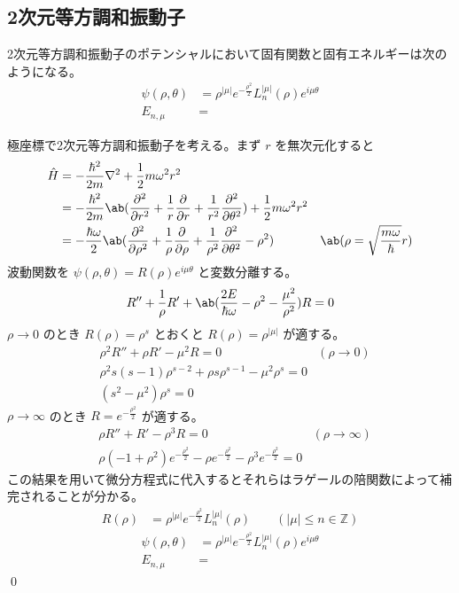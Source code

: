 \documentclass[uplatex,dvipdfmx,a4paper,11pt]{jlreq}
\makeatletter
\newcommand{\ZZ}{\mathbb{Z}}
\numberwithin{equation}{section}
\theoremstyle{definition}
\renewenvironment{proof}[1][\proofname]{\par
  \normalfont
  \topsep6\p@\@plus6\p@ \trivlist
  \item[\hskip\labelsep{\bfseries #1}\@addpunct{\bfseries}]\ignorespaces\quad\par
}{%
  \qed\endtrivlist\@endpefalse
}
\renewcommand\proofname{証明}
\makeatother
\begin{document}
\subsection{2次元等方調和振動子}
\begin{proposition}
  2次元等方調和振動子のポテンシャルにおいて固有関数と固有エネルギーは次のようになる。
  \begin{align}
    \psi(\rho, \theta) & = \rho^{|\mu|}e^{-\frac{\rho^2}{2}}L_n^{|\mu|}(\rho)e^{i\mu\theta} \\
    E_{n, \mu}         & =
  \end{align}
\end{proposition}
\begin{proof}
  極座標で2次元等方調和振動子を考える。まず $r$ を無次元化すると
  \begin{align}
    \hat{H} & = -\frac{\hbar^2}{2m}\laplacian + \frac{1}{2}m\omega^2r^2                                                                                                      \\
            & = -\frac{\hbar^2}{2m}\ab(\pdv[2]{r} + \frac{1}{r}\pdv{r} + \frac{1}{r^2}\pdv[2]{\theta}) + \frac{1}{2}m\omega^2r^2                                             \\
            & = -\frac{\hbar\omega}{2}\ab(\pdv[2]{\rho} + \frac{1}{\rho}\pdv{\rho} + \frac{1}{\rho^2}\pdv[2]{\theta} - \rho^2)   & \ab(\rho = \sqrt{\frac{m\omega}{\hbar}}r)
  \end{align}
  波動関数を $\psi(\rho, \theta) = R(\rho)e^{i\mu\theta}$ と変数分離する。
  \begin{align}
    R'' + \frac{1}{\rho}R' + \ab(\frac{2E}{\hbar\omega} - \rho^2 - \frac{\mu^2}{\rho^2})R = 0
  \end{align}
  $\rho\to 0$ のとき $R(\rho) = \rho^s$ とおくと $R(\rho) = \rho^{|\mu|}$ が適する。
  \begin{align}
     & \rho^2R'' + \rho R' - \mu^2R = 0                              & (\rho\to 0) \\
     & \rho^2s(s - 1)\rho^{s-2} + \rho s\rho^{s-1} - \mu^2\rho^s = 0               \\
     & (s^2 - \mu^2)\rho^s = 0
  \end{align}
  $\rho\to\infty$ のとき $R = e^{-\frac{\rho^2}{2}}$ が適する。
  \begin{align}
     & \rho R'' + R' - \rho^3R = 0                                                                            & (\rho\to\infty) \\
     & \rho (-1 + \rho^2)e^{-\frac{\rho^2}{2}} - \rho e^{-\frac{\rho^2}{2}} - \rho^3e^{-\frac{\rho^2}{2}} = 0
  \end{align}
  この結果を用いて微分方程式に代入するとそれらはラゲールの陪関数によって補完されることが分かる。
  \begin{align}
    R(\rho) & = \rho^{|\mu|}e^{-\frac{\rho^2}{2}}L_n^{|\mu|}(\rho) \qquad (|\mu|\leq n\in\ZZ)
  \end{align}
  \begin{align}
    \psi(\rho, \theta) & = \rho^{|\mu|}e^{-\frac{\rho^2}{2}}L_n^{|\mu|}(\rho)e^{i\mu\theta} \\
    E_{n, \mu}         & =
  \end{align}
\end{proof}
\end{document}
